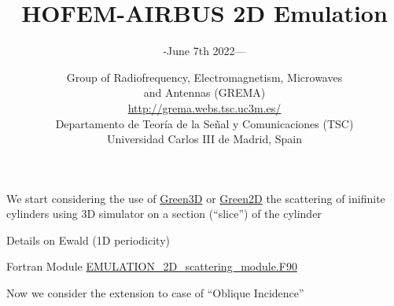 \documentclass[smaller,xcolor=table,dvipsnames]{beamer}
\title[HOFEM-AIRBUS(v{\rcsInfoRevision})]{HOFEM-AIRBUS 2D Emulation}
\author[]{-June 7th 2022---}
\author{}
\date[]{\small{%
    Group of Radiofrequency, Electromagnetism, Microwaves \\ and Antennas (GREMA) \\    \url{http://grema.webs.tsc.uc3m.es/}
 \\[0.8\baselineskip]
    Departamento de Teoría de la Señal y Comunicaciones (TSC) \\
    Universidad Carlos III de Madrid, Spain \\
  }}
\institute{Contact: Luis Emilio García-Castillo
  \url{legcasti@ing.uc3m.es}, Adrián Amor \url{aamor@ing.uc3m.es}, Sergio Llorente \url{sollorent@ing.uc3m.es}}
\newcommand{\GreenT}{\url{Green3D}}
\newcommand{\GreenD}{\url{Green2D}}
\newcommand{\dirinputtex}{./inputtex}
\begin{document}
\begin{frame}
  \titlepage
\end{frame}




  \begin{frame}[plain]
    \centering \Large{We start considering the use of {\GreenT} or
      {\GreenD} the scattering of inifinite cylinders using 3D
      simulator on a section (``slice'') of the cylinder}
    
  \end{frame}

  



  \begin{frame}[plain,label=Ewald1D]
    \centering    \Large{Details on Ewald (1D periodicity)}
  \end{frame}


  



  \begin{frame}[plain]
    \centering    \Large{Fortran Module \url{EMULATION_2D_scattering_module.F90}}
    
  \end{frame}
  
  
  


  \begin{frame}[plain]

    {Now we consider the extension to case of ``Oblique
      Incidence''}
    
  \end{frame}

  
\end{document}
